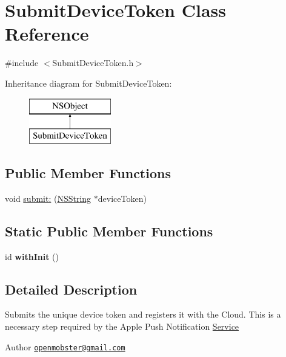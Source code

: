 \hypertarget{interface_submit_device_token}{
\section{\-Submit\-Device\-Token \-Class \-Reference}
\label{interface_submit_device_token}
}


{\ttfamily \#include $<$\-Submit\-Device\-Token.\-h$>$}

\-Inheritance diagram for \-Submit\-Device\-Token\-:\begin{figure}[H]
\begin{center}
\leavevmode
\includegraphics[height=2.000000cm]{interface_submit_device_token}
\end{center}
\end{figure}
\subsection*{\-Public \-Member \-Functions}
\begin{DoxyCompactItemize}
\item 
void \hyperlink{interface_submit_device_token_a14b1f002f93b0182c6d03cbf9f5a4b44}{submit\-:} (\hyperlink{class_n_s_string}{\-N\-S\-String} $\ast$device\-Token)
\end{DoxyCompactItemize}
\subsection*{\-Static \-Public \-Member \-Functions}
\begin{DoxyCompactItemize}
\item 
\hypertarget{interface_submit_device_token_a3addec57fa29ebb0e338024bc9f2b6af}{
id {\bfseries with\-Init} ()}
\label{interface_submit_device_token_a3addec57fa29ebb0e338024bc9f2b6af}

\end{DoxyCompactItemize}


\subsection{\-Detailed \-Description}
\-Submits the unique device token and registers it with the \-Cloud. \-This is a necessary step required by the \-Apple \-Push \-Notification \hyperlink{interface_service}{\-Service} \begin{DoxyAuthor}{\-Author}
\href{mailto:openmobster@gmail.com}{\tt openmobster@gmail.\-com} 
\end{DoxyAuthor}


